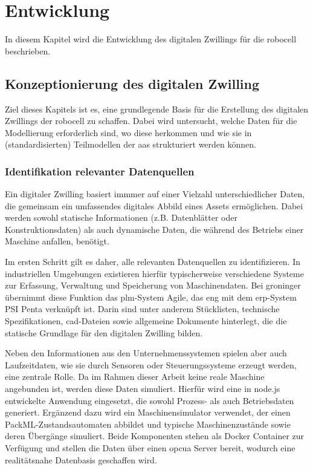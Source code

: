 \section{Entwicklung}
In diesem Kapitel wird die Entwicklung des digitalen Zwillings für die robocell beschrieben.

\subsection{Konzeptionierung des digitalen Zwilling}
Ziel dieses Kapitels ist es, eine grundlegende Basis für die Erstellung des digitalen Zwillings der robocell zu schaffen.
Dabei wird untersucht, welche Daten für die Modellierung erforderlich sind, wo diese herkommen und wie sie in (standardisierten) Teilmodellen der \acs{aas} strukturiert werden können.
\subsubsection{Identifikation relevanter Datenquellen}
Ein digitaler Zwilling basiert immmer auf einer Vielzahl unterschiedlicher Daten, die gemeinsam ein umfassendes digitales Abbild eines Assets ermöglichen. 
Dabei werden sowohl statische Informationen (z.B. Datenblätter oder Konstruktionsdaten) als auch dynamische Daten, die während des Betriebs einer Maschine anfallen, benötigt.

Im ersten Schritt gilt es daher, alle relevanten Datenquellen zu identifizieren.
In industriellen Umgebungen existieren hierfür typischerweise verschiedene Systeme zur Erfassung, Verwaltung und Speicherung von Maschinendaten.
Bei groninger übernimmt diese Funktion das \acs{plm}-System Agile, das eng mit dem \acs{erp}-System PSI Penta verknüpft ist.
Darin sind unter anderem Stücklisten, technische Spezifikationen, \acs{cad}-Dateien sowie allgemeine Dokumente hinterlegt, die die statische Grundlage  für den digitalen Zwilling bilden.

Neben den Informationen aus den Unternehmenssystemen spielen aber auch Laufzeitdaten, wie sie durch Sensoren oder Steuerungssysteme erzeugt werden, eine zentrale Rolle.
Da im Rahmen dieser Arbeit keine reale Maschine angebunden ist, werden diese Daten simuliert.
Hierfür wird eine in node.js entwickelte Anwendung eingesetzt, die sowohl Prozess- als auch Betriebsdaten generiert. 
Ergänzend dazu wird ein Maschinensimulator verwendet, der einen PackML-Zustandsautomaten abbildet und typische Maschinenzustände sowie deren Übergänge simuliert. 
Beide Komponenten stehen als Docker Container zur Verfügung und stellen die Daten über einen \acs{opcua} Server bereit, wodurch eine realitätsnahe Datenbasis geschaffen wird.
